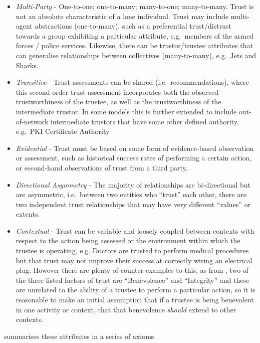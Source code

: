 \begin{itemize}
	\item \emph{Multi-Party} - One-to-one; one-to-many; many-to-one; many-to-many.
	Trust is not an absolute characteristic of a lone individual.
	Trust may include multi-agent abstractions (one-to-many), such as a preferential trust/distrust towards a group exhibiting a particular attribute, e.g.\ members of the armed forces / police services.
	Likewise, there can be trustor/trustee attributes that can generalise relationships between collectives (many-to-many), e.g.\ Jets and Sharks\cite{Robbins1961}.
	\item \emph{Transitive} - Trust assessments can be shared (i.e.\ recommendations), where this second order trust assessment incorporates both the observed trustworthiness of the trustee, as well as the trustworthiness of the intermediate trustor.
	In some models this is further extended to include out-of-network intermediate trustors that have some other defined authority, e.g.\ PKI Certificate Authority
	\item \emph{Evidential} - Trust must be based on some form of evidence-based observation or assessment, such as historical success rates of performing a certain action, or second-hand observations of trust from a third party.
	\item \emph{Directional Asymmetry} - The majority of relationships are bi-directional but are asymmetric, i.e.\ between two entities who ``trust'' each other, there are two independent trust relationships that may have very different ``values'' or extents.
	\item \emph{Contextual} - Trust can be variable and loosely coupled between contexts with respect to the action being assessed or the environment within which the trustee is operating, e.g.
	Doctors are trusted to perform medical procedures but that trust may not improve their success at correctly wiring an electrical plug.
	However there are plenty of counter-examples to this, as from \cite{Mayer1995}, two of the three listed factors of trust are ``Benevolence'' and ``Integrity'' and these are unrelated to the ability of a trustee to perform a particular action, so it is reasonable to make an initial assumption that if a trustee is being benevolent in one activity or context, that that benevolence \emph{should} extend to other contexts.
\end{itemize}

\cite{Liu2010} summarises these attributes in a series of axioms 


